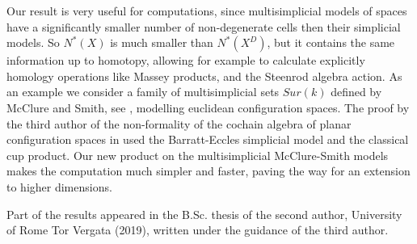 Our result is very useful for computations, since multisimplicial models of spaces have a significantly smaller number of non-degenerate cells then their simplicial models.
So $N^*(X)$ is much smaller than $N^*(X^D)$, but it contains the same information up to homotopy, allowing for example to calculate explicitly homology operations like Massey products, and the Steenrod algebra action.
As an example we consider a family of multisimplicial sets $Sur(k)$ defined by McClure and Smith, see \cite{MS}, modelling euclidean configuration spaces.
The proof by the third author of the non-formality of the cochain algebra of planar configuration spaces in \cite{formality} used the Barratt-Eccles simplicial model and the classical cup product.
Our new product on the multisimplicial McClure-Smith models makes the computation much simpler and faster, paving the way for an extension to higher dimensions.

\medskip

Part of the results appeared in the B.Sc. thesis of the second author, University of Rome Tor Vergata (2019), written under the guidance of the third author.